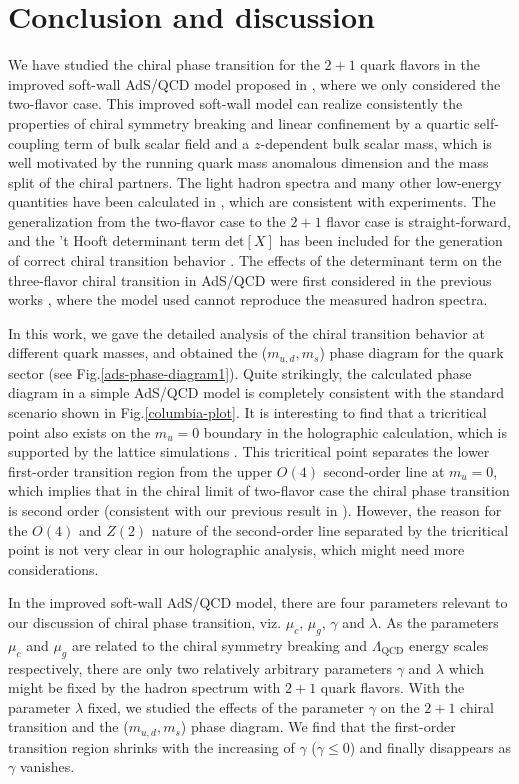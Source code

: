 \documentclass[11pt,a4paper,psfrag]{article}
\begin{document}
\section{Conclusion and discussion}\label{conclusion}

We have studied the chiral phase transition for the $2+1$ quark flavors in the improved soft-wall AdS/QCD model proposed in \cite{Fang:2016nfj}, where we only considered the two-flavor case. This improved soft-wall model can realize consistently the properties of chiral symmetry breaking and linear confinement by a quartic self-coupling term of bulk scalar field and a $z$-dependent bulk scalar mass, which is well motivated by the running quark mass anomalous dimension and the mass split of the chiral partners. The light hadron spectra and many other low-energy quantities have been calculated in \cite{Fang:2016nfj}, which are consistent with experiments. The generalization from the two-flavor case to the $2+1$ flavor case is straight-forward, and the 't Hooft determinant term $\mathrm{det}[X]$ has been included for the generation of correct chiral transition behavior \cite{Chelabi:2015gpc}. The effects of the determinant term on the three-flavor chiral transition in AdS/QCD were first considered in the previous works \cite{Chelabi:2015cwn,Chelabi:2015gpc}, where the model used cannot reproduce the measured hadron spectra.

In this work, we gave the detailed analysis of the chiral transition behavior at different quark masses, and obtained the ($m_{u,d}, m_s$) phase diagram for the quark sector (see Fig.\ref{ads-phase-diagram1}). Quite strikingly, the calculated phase diagram in a simple AdS/QCD model is completely consistent with the standard scenario shown in Fig.\ref{columbia-plot}. It is interesting to find that a tricritical point also exists on the $m_{u}=0$ boundary in the holographic calculation, which is supported by the lattice simulations \cite{Bhattacharya:2014ara}. This tricritical point separates the lower first-order transition region from the upper $O(4)$ second-order line at $m_{u}=0$, which implies that in the chiral limit of two-flavor case the chiral phase transition is second order (consistent with our previous result in \cite{Fang:2016nfj}). However, the reason for the $O(4)$ and $Z(2)$ nature of the second-order line separated by the tricritical point is not very clear in our holographic analysis, which might need more considerations.

In the improved soft-wall AdS/QCD model, there are four parameters relevant to our discussion of chiral phase transition, viz. $\mu_{c}$, $\mu_{g}$, $\gamma$ and $\lambda$. As the parameters $\mu_{c}$ and $\mu_{g}$ are related to the chiral symmetry breaking and $\Lambda_{\mathrm{QCD}}$ energy scales respectively, there are only two relatively arbitrary parameters $\gamma$ and $\lambda$ which might be fixed by the hadron spectrum with $2+1$ quark flavors. With the parameter $\lambda$ fixed, we studied the effects of the parameter $\gamma$ on the $2+1$ chiral transition and the ($m_{u,d}, m_s$) phase diagram. We find that the first-order transition region shrinks with the increasing of $\gamma$ ($\gamma\leq 0$) and finally disappears as $\gamma$ vanishes.
\end{document}
